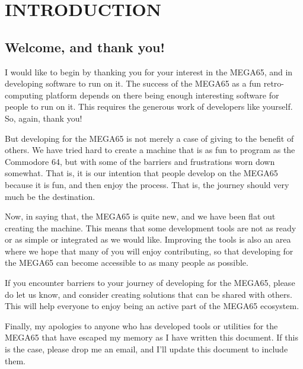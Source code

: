 







\cleardoublepage
{}

\part{INTRODUCTION}

\chapter{Welcome, and thank you!}

I would like to begin by thanking you for your interest in the MEGA65,
and in developing software to run on it. The success of the MEGA65 as
a fun retro-computing platform depends on there being enough
interesting software for people to run on it.  This requires the
generous work of developers like yourself. So, again, thank you!

But developing for the MEGA65 is not merely a case of giving to the
benefit of others. We have tried hard to create a machine that is as
fun to program as the Commodore 64, but with some of the barriers
and frustrations worn down somewhat.  That is, it is our intention
that people develop on the MEGA65 because it is fun, and then enjoy
the process.  That is, the journey should very much be the
destination.

Now, in saying that, the MEGA65 is quite new, and we have been flat
out creating the machine. This means that some development tools are
not as ready or as simple or integrated as we would like.  Improving
the tools is also an area where we hope that many of you will enjoy
contributing, so that developing for the MEGA65 can become accessible
to as many people as possible.

If you encounter barriers to your
journey of developing for the MEGA65, please do let us know, and
consider creating solutions that can be shared with others.  This will
help everyone to enjoy being an active part of the MEGA65 ecosystem.

Finally, my apologies to anyone who has developed tools or utilities
for the MEGA65 that have escaped my memory as I have written this
document.  If this is the case, please drop me an email, and I'll
update this document to include them.

